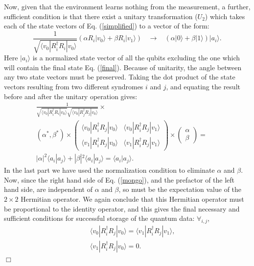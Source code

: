Now, given that the environment learns nothing from the measurement, a
further, sufficient condition is that there exist a unitary
transformation ($U_2$) which takes each of the state vectors of
Eq. (\ref{simplified}) to a vector of the form:
\begin{equation}
\frac{1}{\sqrt{\langle v_0|R_i^\dagger R_i|v_0\rangle}}
(\alpha R_i|v_0\rangle+\beta R_i|v_1\rangle)\ \ \ \ \rightarrow\ \ \ \
(\alpha|0\rangle+\beta|1\rangle)|a_i\rangle.
\end{equation}
Here $|a_i\rangle$ is a normalized state vector of all the qubits
excluding the one which will contain the final state
Eq. (\ref{final}).  Because of unitarity, the angle between any two
state vectors must be preserved.  Taking the dot product of the state
vectors resulting from two different syndromes $i$ and $j$,
and equating the result before and after the
unitary operation gives:
\begin{eqnarray}
\frac{1}{\sqrt{\langle v_0|R_i^\dagger R_i|v_0\rangle}
\sqrt{\langle v_0|R_j^\dagger R_j|v_0\rangle}}\times
\;\;\;\;\;\;\;\;\;\;\;\;\;\;\;\;\;\;\;\;\;\;\;\;\; && \nonumber \\
(\alpha^\ast,\beta^\ast)\times\left (\begin{array}{cc}
\langle v_0|R_i^\dagger R_j|v_0\rangle&\langle v_0|R_i^\dagger R_j|v_1\rangle\\
\langle v_1|R_i^\dagger R_j|v_0\rangle&\langle v_1|R_i^\dagger R_j|v_1\rangle
\end{array}\right )\times\left (\begin{array}{c}\alpha\\ \beta
\end{array}\right )= && \nonumber \\
|\alpha|^2\langle a_i|a_j\rangle+
|\beta|^2\langle a_i|a_j\rangle=\langle a_i|a_j\rangle.&&\label{mongo}
\end{eqnarray}
In the last part we have used the normalization condition to
eliminate $\alpha$ and $\beta$.  Now, since the right hand side
of Eq. (\ref{mongo}), and the prefactor of the left hand side, are
independent of $\alpha$ and $\beta$, so must be the expectation
value of the $2\times 2$ Hermitian operator.  We again conclude
that this Hermitian operator must be proportional to the identity
operator, and this gives the final necessary and sufficient
conditions\cite{footus}
for successful storage of the quantum data: $\forall_{i,j}$,
\begin{eqnarray}
&&\langle v_0|R_i^\dagger R_j|v_0\rangle=\langle v_1|R_i^\dagger R_j|v_1
\rangle,\label{thelasta}\\
&&\langle v_1|R_i^\dagger R_j|v_0\rangle=0.\label{thelastb}
\end{eqnarray}
\newline$\Box$
 
